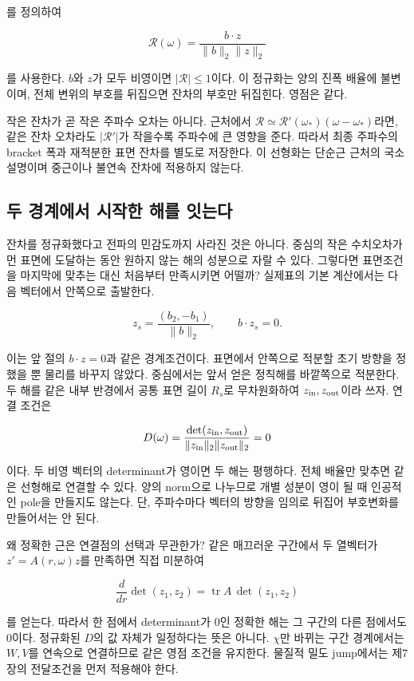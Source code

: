 \documentclass[
  10pt,
  a4paper,
]{article}
\begin{document}
를 정의하여

\[
\mathcal R(\omega)=\frac{b\cdot z}{\|b\|_2\|z\|_2}
\]

를 사용한다. \(b\)와 \(z\)가 모두 비영이면 \(|\mathcal R|\leq1\)이다. 이
정규화는 양의 진폭 배율에 불변이며, 전체 변위의 부호를 뒤집으면 잔차의
부호만 뒤집힌다. 영점은 같다.

작은 잔차가 곧 작은 주파수 오차는 아니다. 근처에서
\(\mathcal R\simeq\mathcal R'(\omega_*)(\omega-\omega_*)\)라면, 같은
잔차 오차라도 \(|\mathcal R'|\)가 작을수록 주파수에 큰 영향을 준다.
따라서 최종 주파수의 bracket 폭과 재적분한 표면 잔차를 별도로 저장한다.
이 선형화는 단순근 근처의 국소 설명이며 중근이나 불연속 잔차에 적용하지
않는다.

\subsection{두 경계에서 시작한 해를
잇는다}\label{uxb450-uxacbduxacc4uxc5d0uxc11c-uxc2dcuxc791uxd55c-uxd574uxb97c-uxc787uxb294uxb2e4}

잔차를 정규화했다고 전파의 민감도까지 사라진 것은 아니다. 중심의 작은
수치오차가 먼 표면에 도달하는 동안 원하지 않는 해의 성분으로 자랄 수
있다. 그렇다면 표면조건을 마지막에 맞추는 대신 처음부터 만족시키면
어떨까? 실제표의 기본 계산에서는 다음 벡터에서 안쪽으로 출발한다.

\[
z_s=\frac{(b_2,-b_1)}{\|b\|_2},\qquad b\cdot z_s=0.
\]

이는 앞 절의 \(b\cdot z=0\)과 같은 경계조건이다. 표면에서 안쪽으로
적분할 초기 방향을 정했을 뿐 물리를 바꾸지 않았다. 중심에서는 앞서 얻은
정칙해를 바깥쪽으로 적분한다. 두 해를 같은 내부 반경에서 공통 표면 길이
\(R_s\)로 무차원화하여 \(z_{\rm in},z_{\rm out}\)이라 쓰자. 연결 조건은

\[
D(\omega)=\frac{\det(z_{\rm in},z_{\rm out})}
{\|z_{\rm in}\|_2\|z_{\rm out}\|_2}=0
\]

이다. 두 비영 벡터의 determinant가 영이면 두 해는 평행하다. 전체 배율만
맞추면 같은 선형해로 연결할 수 있다. 양의 norm으로 나누므로 개별 성분이
영이 될 때 인공적인 pole을 만들지도 않는다. 단, 주파수마다 벡터의 방향을
임의로 뒤집어 부호변화를 만들어서는 안 된다.

왜 정확한 근은 연결점의 선택과 무관한가? 같은 매끄러운 구간에서 두
열벡터가 \(z'=A(r,\omega)z\)를 만족하면 직접 미분하여

\[
\frac{d}{dr}\det(z_1,z_2)=\operatorname{tr}A\,\det(z_1,z_2)
\]

를 얻는다. 따라서 한 점에서 determinant가 0인 정확한 해는 그 구간의 다른
점에서도 0이다. 정규화된 \(D\)의 값 자체가 일정하다는 뜻은 아니다.
\(\chi\)만 바뀌는 구간 경계에서는 \(W,V\)를 연속으로 연결하므로 같은
영점 조건을 유지한다. 물질적 밀도 jump에서는 제7장의 전달조건을 먼저
적용해야 한다.
\end{document}
